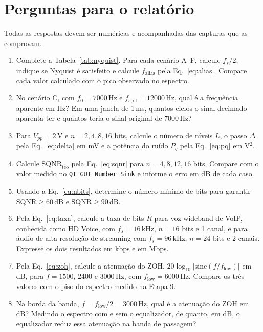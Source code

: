 \documentclass[11pt,a4paper]{article}
\begin{document}
\section{Perguntas para o relatório}

Todas as respostas devem ser numéricas e acompanhadas das capturas que as
comprovam.

\begin{enumerate}[label=\textbf{Q\arabic*.}, leftmargin=*]

  \item Complete a Tabela~\ref{tab:nyquist}. Para cada cenário A--F,
    calcule $f_s/2$, indique se Nyquist é satisfeito e calcule
    $f_\text{alias}$ pela Eq.~\eqref{eq:alias}. Compare cada valor calculado
    com o pico observado no espectro.

  \item No cenário C, com $f_0 = 7000$\,Hz e $f_{s,\text{ef}} = 12000$\,Hz,
    qual é a frequência aparente em Hz? Em uma janela de 1\,ms, quantos
    ciclos o sinal decimado aparenta ter e quantos teria o sinal original
    de 7000\,Hz?

  \item Para $V_{pp} = 2$\,V e $n = 2, 4, 8, 16$ bits, calcule o número de
    níveis $L$, o passo $\Delta$ pela Eq.~\eqref{eq:delta} em mV e a potência
    do ruído $P_q$ pela Eq.~\eqref{eq:pq} em V$^2$.

  \item Calcule $\text{SQNR}_\text{teo}$ pela Eq.~\eqref{eq:sqnr} para
    $n = 4, 8, 12, 16$ bits. Compare com o valor medido no
    \texttt{QT GUI Number Sink} e informe o erro em dB de cada caso.

  \item Usando a Eq.~\eqref{eq:nbits}, determine o número mínimo de bits para
    garantir $\text{SQNR} \geq 60$\,dB e $\text{SQNR} \geq 90$\,dB.

  \item Pela Eq.~\eqref{eq:taxa}, calcule a taxa de bits $R$ para voz
    wideband de VoIP, conhecida como HD Voice, com $f_s = 16$\,kHz,
    $n = 16$ bits e 1 canal, e para áudio de alta resolução de streaming
    com $f_s = 96$\,kHz, $n = 24$ bits e 2 canais. Expresse os dois
    resultados em kbps e em Mbps.

  \item Pela Eq.~\eqref{eq:zoh}, calcule a atenuação do ZOH,
    $20\log_{10}|\text{sinc}(f/f_\text{low})|$ em dB, para $f = 1500$, $2400$
    e $3000$\,Hz, com $f_\text{low} = 6000$\,Hz. Compare os três valores com o
    piso do espectro medido na Etapa 9.

  \item Na borda da banda, $f = f_\text{low}/2 = 3000$\,Hz, qual é a atenuação
    do ZOH em dB? Medindo o espectro com e sem o equalizador, de quanto, em
    dB, o equalizador reduz essa atenuação na banda de passagem?

\end{enumerate}
\end{document}
